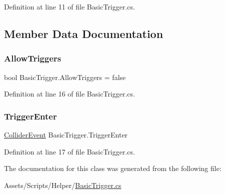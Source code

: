 Definition at line 11 of file Basic\+Trigger.\+cs.



\subsection{Member Data Documentation}
\mbox{\label{class_basic_trigger_a319c21e548d897c9323ca2ebdbdc6c5c}} 
\subsubsection{\texorpdfstring{Allow\+Triggers}{AllowTriggers}}
{\footnotesize\ttfamily bool Basic\+Trigger.\+Allow\+Triggers = false}



Definition at line 16 of file Basic\+Trigger.\+cs.

\mbox{\label{class_basic_trigger_aa8792e4f8de7efc8fb242c8ba181c17e}} 
\subsubsection{\texorpdfstring{Trigger\+Enter}{TriggerEnter}}
{\footnotesize\ttfamily \mbox{\hyperlink{class_basic_trigger_1_1_collider_event}{Collider\+Event}} Basic\+Trigger.\+Trigger\+Enter}



Definition at line 17 of file Basic\+Trigger.\+cs.



The documentation for this class was generated from the following file\+:\begin{DoxyCompactItemize}
\item 
Assets/\+Scripts/\+Helper/\mbox{\hyperlink{_basic_trigger_8cs}{Basic\+Trigger.\+cs}}\end{DoxyCompactItemize}

